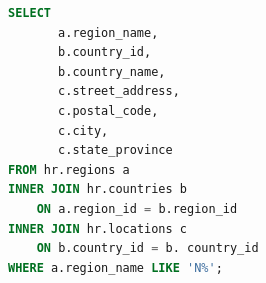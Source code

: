 \documentclass[onecolumn, draftclsnofoot,10pt, compsoc]{IEEEtran}
\begin{document}
    \begin{center}
    \begin{lstlisting}[language=SQL]
SELECT
       a.region_name,
       b.country_id,
       b.country_name,
       c.street_address,
       c.postal_code,
       c.city,
       c.state_province
FROM hr.regions a
INNER JOIN hr.countries b
    ON a.region_id = b.region_id
INNER JOIN hr.locations c
    ON b.country_id = b. country_id
WHERE a.region_name LIKE 'N%';
\end{lstlisting}
\end{center}
\end{document}
